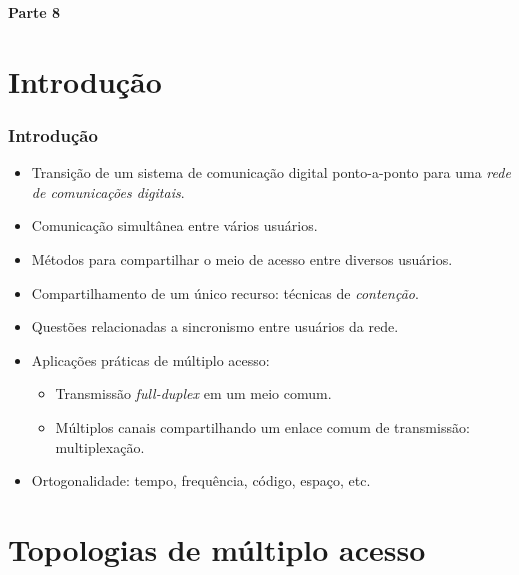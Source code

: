 
\begin{frame}
	\begin{block}{\centering\large\bfseries Parte 8}
		\centering\large\insertpart
	\end{block}
\end{frame}


\section{Introdução}

\begin{frame}
	\frametitle{Introdução}

	\begin{itemize}
	    \item Transição de um sistema de comunicação digital ponto-a-ponto para uma \textit{rede de comunicações digitais}.
	    \item Comunicação simultânea entre vários usuários.
	    \item Métodos para compartilhar o meio de acesso entre diversos usuários.
	    \item Compartilhamento de um único recurso: técnicas de \textit{contenção}.
	    \item Questões relacionadas a sincronismo entre usuários da rede.
	    \item Aplicações práticas de múltiplo acesso:
	    \begin{itemize}
		\item Transmissão \textit{full-duplex} em um meio comum.
		\item Múltiplos canais compartilhando um enlace comum de transmissão: multiplexação.
	    \end{itemize}	    
	    \item Ortogonalidade: tempo, frequência, código, espaço, etc.
	\end{itemize}			
\end{frame}

\section{Topologias de múltiplo acesso}

